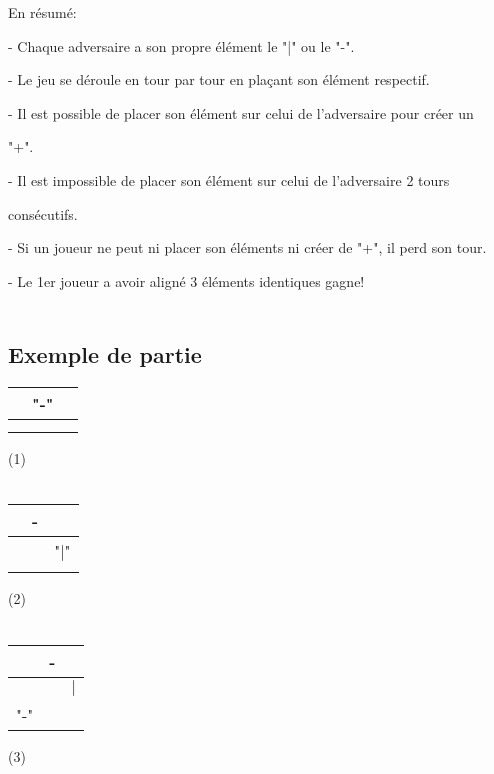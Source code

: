 \documentclass[12pt]{article}
\begin{document}
    
    En résumé:
    
    
    - Chaque adversaire a son propre élément le "|" ou le "-".
    
    
    
    - Le jeu se déroule en tour par tour en plaçant son élément respectif.
    
    
    - Il est possible de placer son élément sur celui de l'adversaire pour créer un 
    
    "+".
    
    
    - Il est impossible de placer son élément sur celui de l'adversaire 2 tours 
    
    consécutifs.
    
    
    - Si un joueur ne peut ni placer son éléments ni créer de "+", il perd son tour. 
    
    
    - Le 1er joueur a avoir aligné 3 éléments identiques gagne! \\ \\

\subsection{Exemple de partie}


\begin{tabular}{c|c|c}
   & "-" &  \\      \hline
   &  &  \\      \hline
   &  & 
\end{tabular}
\qquad 

(1) \\ \\

\begin{tabular}{c|c|c}
   & - &  \\      \hline
   &  & "$\vert$" \\      \hline
   &  & 
\end{tabular}
\qquad 

(2) \\ \\

\begin{tabular}{c|c|c}
   & - &  \\      \hline
   &  & $\vert$ \\      \hline
  "-" &  & 
\end{tabular}
\qquad 

(3) \\ \\
\end{document}
